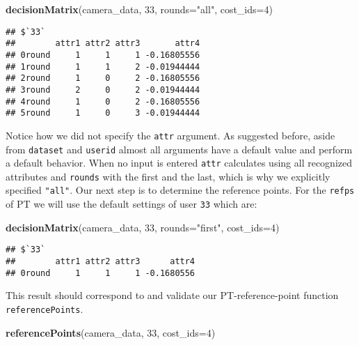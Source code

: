 \documentclass[]{article}
\newenvironment{Shaded}{\begin{snugshade}}{\end{snugshade}}
\newcommand{\KeywordTok}[1]{\textcolor[rgb]{0.13,0.29,0.53}{\textbf{{#1}}}}
\newcommand{\DataTypeTok}[1]{\textcolor[rgb]{0.13,0.29,0.53}{{#1}}}
\newcommand{\DecValTok}[1]{\textcolor[rgb]{0.00,0.00,0.81}{{#1}}}
\newcommand{\StringTok}[1]{\textcolor[rgb]{0.31,0.60,0.02}{{#1}}}
\newcommand{\NormalTok}[1]{{#1}}
\begin{document}
\begin{Shaded}
\begin{Highlighting}[]
\KeywordTok{decisionMatrix}\NormalTok{(camera_data, }\DecValTok{33}\NormalTok{, }\DataTypeTok{rounds=}\StringTok{"all"}\NormalTok{, }\DataTypeTok{cost_ids=}\DecValTok{4}\NormalTok{)}
\end{Highlighting}
\end{Shaded}

\begin{verbatim}
## $`33`
##        attr1 attr2 attr3       attr4
## 0round     1     1     1 -0.16805556
## 1round     1     1     2 -0.01944444
## 2round     1     0     2 -0.16805556
## 3round     2     0     2 -0.01944444
## 4round     1     0     2 -0.16805556
## 5round     1     0     3 -0.01944444
\end{verbatim}

Notice how we did not specify the \texttt{attr} argument. As suggested
before, aside from \texttt{dataset} and \texttt{userid} almost all
arguments have a default value and perform a default behavior. When no
input is entered \texttt{attr} calculates using all recognized
attributes and \texttt{rounds} with the first and the last, which is why
we explicitly specified \texttt{"all"}. Our next step is to determine
the reference points. For the \texttt{refps} of PT we will use the
default settings of user \texttt{33} which are:

\begin{Shaded}
\begin{Highlighting}[]
\KeywordTok{decisionMatrix}\NormalTok{(camera_data, }\DecValTok{33}\NormalTok{, }\DataTypeTok{rounds=}\StringTok{"first"}\NormalTok{, }\DataTypeTok{cost_ids=}\DecValTok{4}\NormalTok{)}
\end{Highlighting}
\end{Shaded}

\begin{verbatim}
## $`33`
##        attr1 attr2 attr3      attr4
## 0round     1     1     1 -0.1680556
\end{verbatim}

This result should correspond to and validate our PT-reference-point
function \texttt{referencePoints}.

\begin{Shaded}
\begin{Highlighting}[]
\KeywordTok{referencePoints}\NormalTok{(camera_data, }\DecValTok{33}\NormalTok{, }\DataTypeTok{cost_ids=}\DecValTok{4}\NormalTok{)}
\end{Highlighting}
\end{Shaded}
\end{document}
